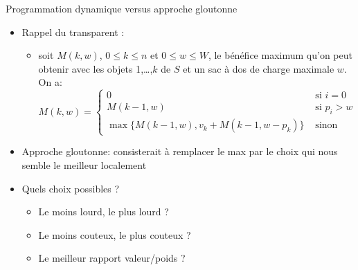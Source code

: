 \begin{frame}{Programmation dynamique versus approche gloutonne}
\begin{itemize}
\item Rappel du transparent \pageref{part6:knapsack}:
\begin{itemize}
\item soit $M(k,w)$, $0\leq k\leq n$ et $0\leq w\leq W$, le bénéfice
  maximum qu'on peut obtenir avec les objets 1,\ldots,$k$ de $S$ et un
  sac à dos de charge maximale $w$. On a:
  {\small \[M(k,w)=\left\{\begin{array}{ll} 0 & \mbox{ si
    }i=0\\ M(k-1,w) & \mbox{ si }
    p_i>w\\ \max\{M(k-1,w),v_k+M(k-1,w-p_k)\} & \mbox{ sinon}
\end{array}
\right.
\]}
\end{itemize}
\item Approche gloutonne: consisterait à remplacer le \alert{max} par le choix qui nous semble le meilleur localement
\item Quels choix possibles ?
\begin{itemize}
\item Le moins lourd, le plus lourd ?
\item Le moins couteux, le plus couteux ?
\item Le meilleur rapport valeur/poids ?
\end{itemize}
\end{itemize}

\end{frame}

